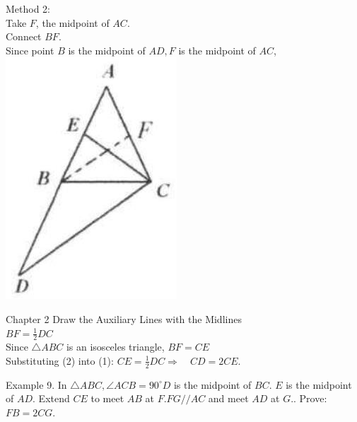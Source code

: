 \documentclass[10pt]{article}
\begin{document}
Method 2:\\
Take \(F\), the midpoint of \(A C\).\\
Connect \(B F\).\\
Since point \(B\) is the midpoint of \(A D, F\) is the midpoint of \(A C\),\\
\includegraphics[max width=\textwidth, center]{2025_04_17_97bc1f7e44d93c271a88g-039(2)}

Chapter 2 Draw the Auxiliary Lines with the Midlines\\
\(B F=\frac{1}{2} D C\)\\
Since \(\triangle A B C\) is an isosceles triangle, \(B F=C E\)\\
Substituting (2) into (1): \(C E=\frac{1}{2} D C \Rightarrow \quad C D=2 C E\).

Example 9. In \(\triangle A B C, \angle A C B=90^{\circ} D\) is the midpoint of \(B C\). \(E\) is the midpoint of \(A D\). Extend \(C E\) to meet \(A B\) at \(F . F G / / A C\) and meet \(A D\) at \(G\).. Prove: \(F B=2 C G\).
\end{document}
